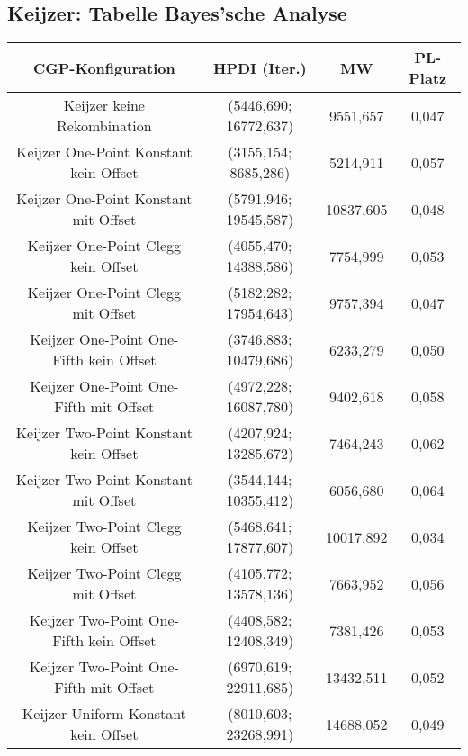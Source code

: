 \subsection{Keijzer: Tabelle Bayes'sche Analyse}
\label{subsec:appendixTabelleBayesKeijzer}
 \begin{table}[H]
	\centering
	\begin{tabular}{c | c | c | c}
		\textbf{CGP-Konfiguration} & \textbf{HPDI (Iter.)} & \textbf{MW} & \textbf{PL-Platz}\\
		\hline
		Keijzer keine Rekombination & (5446,690; 16772,637) & 9551,657 & 0,047\\
		\hline
		\hline
		Keijzer One-Point Konstant kein Offset & \color{Green}(3155,154; 8685,286)\color{black} & \color{Green}5214,911\color{black} & 0,057\\
		\hline
		Keijzer One-Point Konstant mit Offset & (5791,946; 19545,587) & 10837,605 & 0,048\\
		\hline
		Keijzer One-Point Clegg kein Offset & (4055,470; 14388,586) & 7754,999 & 0,053\\
		\hline
		Keijzer One-Point Clegg mit Offset & (5182,282; 17954,643) & 9757,394 & 0,047\\
		\hline
		Keijzer One-Point One-Fifth kein Offset & \color{Green}(3746,883; 10479,686)\color{black} & 6233,279 & 0,050\\
		\hline
		Keijzer One-Point One-Fifth mit Offset & (4972,228; 16087,780) & 9402,618 & 0,058\\
		\hline
		\hline
		Keijzer Two-Point Konstant kein Offset & (4207,924; 13285,672) & 7464,243 & 0,062\\
		\hline
		Keijzer Two-Point Konstant mit Offset & \color{Green}(3544,144; 10355,412)\color{black} & \color{Green}6056,680\color{black} & \color{Green}0,064\color{black}\\
		\hline
		Keijzer Two-Point Clegg kein Offset & (5468,641; 17877,607) & 10017,892 & \color{red}0,034\color{black}\\
		\hline
		Keijzer Two-Point Clegg mit Offset & (4105,772; 13578,136) & 7663,952 & 0,056\\
		\hline
		Keijzer Two-Point One-Fifth kein Offset & (4408,582; 12408,349) & 7381,426 & 0,053\\
		\hline
		Keijzer Two-Point One-Fifth mit Offset & \color{red}(6970,619; 22911,685)\color{black} & \color{red}13432,511\color{black} & 0,052\\
		\hline
		\hline
		Keijzer Uniform Konstant kein Offset & \color{red}(8010,603; 23268,991)\color{black} & \color{red}14688,052\color{black} & 0,049\\

\end{tabular}
\end{table}
